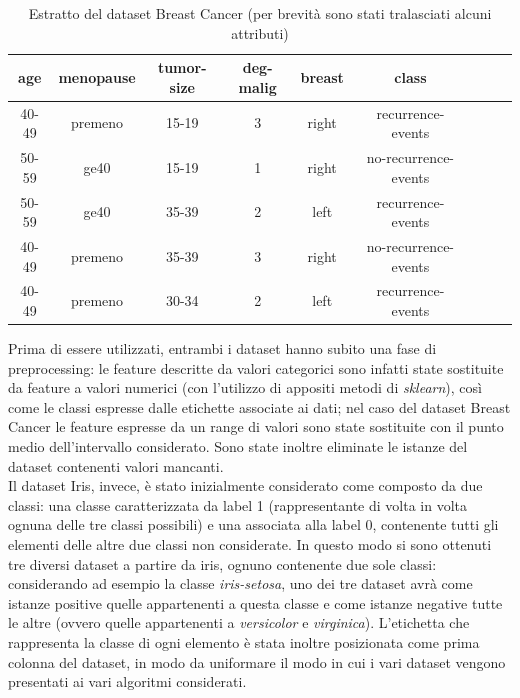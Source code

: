 \documentclass[oneside, openany]{book}
\begin{document}
	\begin{table}
		\caption{Estratto del dataset Breast Cancer (per brevità sono stati tralasciati alcuni attributi)}
		\begin{center}
			\begin{tabular}{|c|c|c|c|c|c|c|c|c|}
				\hline
					age &  menopause &  tumor-size &  deg-malig &  breast &  class\\
				\hline
					40-49 &   premeno &      15-19 &          3 &  right &     recurrence-events\\ 
					50-59 &      ge40 &      15-19 &          1 &  right &     no-recurrence-events\\ 
					50-59 &      ge40 &      35-39 &          2 &   left &     recurrence-events\\ 
					40-49 &   premeno &      35-39 &          3 &  right &     no-recurrence-events\\
					40-49 &   premeno &      30-34 &          2 &   left &     recurrence-events\\
				\hline	
			\end{tabular}
		\end{center}
		\label{tab:breast}
	\end{table}
	
	Prima di essere utilizzati, entrambi i dataset hanno subito una fase di preprocessing: le feature descritte da valori categorici sono infatti state sostituite da feature a valori numerici (con l'utilizzo di appositi metodi di \textit{sklearn}), così come le classi espresse dalle etichette associate ai dati; nel caso del dataset Breast Cancer le feature espresse da un range di valori sono state sostituite con il punto medio dell'intervallo considerato. Sono state inoltre eliminate le istanze del dataset contenenti valori mancanti.\\
	Il dataset Iris, invece, è stato inizialmente considerato come composto da due classi: una classe caratterizzata da label 1 (rappresentante di volta in volta ognuna delle tre classi possibili) e una associata alla label 0, contenente tutti gli elementi delle altre due classi non considerate. In questo modo si sono ottenuti tre diversi dataset a partire da iris, ognuno contenente due sole classi: considerando ad esempio la classe \textit{iris-setosa}, uno dei tre dataset avrà come istanze positive quelle appartenenti a questa classe e come istanze negative tutte le altre (ovvero quelle appartenenti a \textit{versicolor} e \textit{virginica}).  L'etichetta che rappresenta la classe di ogni elemento è stata inoltre posizionata come prima colonna del dataset, in modo da uniformare il modo in cui i vari dataset vengono presentati ai vari algoritmi considerati.
	 
\end{document}
